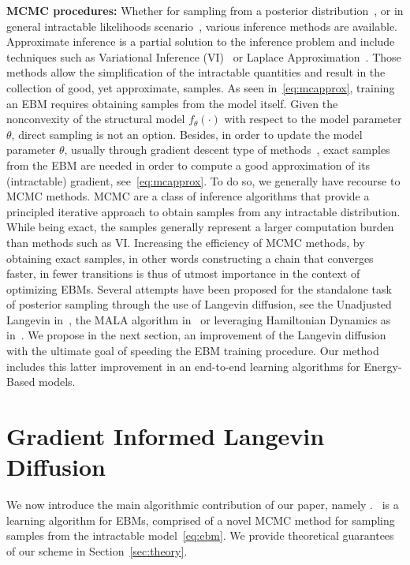\documentclass{article} %
\begin{document}
\vspace{0.05in}\noindent\textbf{MCMC procedures: }
Whether for sampling from a posterior distribution~\cite{mh:robert}, or in general intractable likelihoods scenario~\cite{doucet2000sequential}, various inference methods are available.
Approximate inference is a partial solution to the inference problem and include techniques such as Variational Inference (VI)~\cite{jordanvi,freitas} or Laplace Approximation~\cite{wolfinger,rue2009approximate}. 
Those methods allow the simplification of the intractable quantities and result in the collection of good, yet approximate, samples.
As seen in~\eqref{eq:mcapprox}, training an EBM requires obtaining samples from the model itself.
Given the nonconvexity of the structural model $f_\theta(\cdot)$ with respect to the model parameter $\theta$, direct sampling is not an option.
Besides, in order to update the model parameter $\theta$, usually through gradient descent type of methods~\cite{bottou2008},  exact samples from the EBM are needed in order to compute a good approximation of its (intractable) gradient, see~\eqref{eq:mcapprox}.
To do so, we generally have recourse to MCMC methods.
MCMC are a class of inference algorithms that provide a principled iterative approach to obtain samples from any intractable distribution.
While being exact, the samples generally represent a larger computation burden than methods such as VI.
Increasing the efficiency of MCMC methods, by obtaining exact samples, in other words constructing a chain that converges faster, in fewer transitions is thus of utmost importance in the context of optimizing EBMs.
Several attempts have been proposed for the standalone task of posterior sampling through the use of Langevin diffusion, see the Unadjusted Langevin in~\citet{brosse2017tamed}, the MALA algorithm in~\citet{roberts,robertsmala,durmus2017fast} or leveraging Hamiltonian Dynamics as in~\citet{girolami2011riemann}.
We propose in the next section, an improvement of the Langevin diffusion with the ultimate goal of speeding the EBM training procedure.
Our method includes this latter improvement in an end-to-end learning algorithms for Energy-Based models.

\section{Gradient Informed Langevin Diffusion}\label{sec:main}

We now introduce the main algorithmic contribution of our paper, namely \algo.
\algo\ is a learning algorithm for EBMs, comprised of a novel MCMC method for sampling samples from the intractable model~\eqref{eq:ebm}.
We provide theoretical guarantees of our scheme in Section~\ref{sec:theory}.
\end{document}
